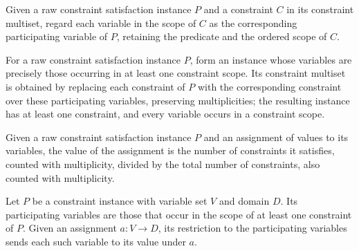 \begin{definition}
\label{FABL.RawCSPInstance.participatingConstraint}
\leanok
{}
Given a raw constraint satisfaction instance $P$ and a constraint $C$ in its constraint
multiset, regard each variable in the scope of $C$ as the corresponding participating
variable of $P$, retaining the predicate and the ordered scope of $C$.
\end{definition}

\begin{definition}
\label{FABL.RawCSPInstance.removeIsolatedVariables}
\leanok
{}
For a raw constraint satisfaction instance $P$, form an instance whose variables are
precisely those occurring in at least one constraint scope. Its constraint multiset is
obtained by replacing each constraint of $P$ with the corresponding constraint over
these participating variables, preserving multiplicities; the resulting instance has at
least one constraint, and every variable occurs in a constraint scope.
\end{definition}

\begin{definition}
\label{FABL.RawCSPInstance.value}
\leanok
{}
Given a raw constraint satisfaction instance $P$ and an assignment of values to its
variables, the value of the assignment is the number of constraints it satisfies,
counted with multiplicity, divided by the total number of constraints, also counted with
multiplicity.
\end{definition}

\begin{definition}
\label{FABL.RawCSPInstance.restrictAssignment}
\leanok
{}
Let $P$ be a constraint instance with variable set $V$ and domain $D$. Its participating
variables are those that occur in the scope of at least one constraint of $P$. Given an
assignment $a:V\to D$, its restriction to the participating variables sends each such
variable to its value under $a$.
\end{definition}

